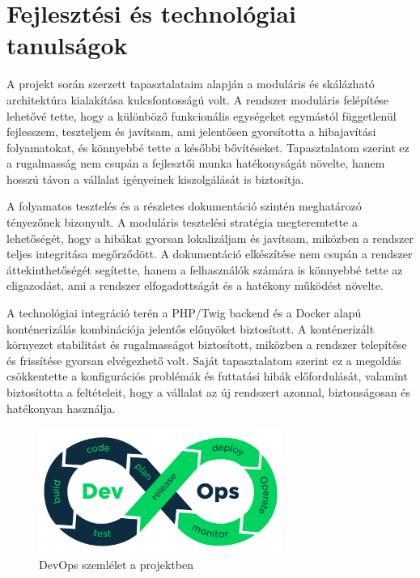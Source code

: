 \section{Fejlesztési és technológiai tanulságok}

A projekt során szerzett tapasztalataim alapján a moduláris és skálázható architektúra kialakítása kulcsfontosságú volt. 
A rendszer moduláris felépítése lehetővé tette, hogy a különböző funkcionális egységeket egymástól függetlenül fejlesszem, 
teszteljem és javítsam, ami jelentősen gyorsította a hibajavítási folyamatokat, és könnyebbé tette a későbbi bővítéseket. 
Tapasztalatom szerint ez a rugalmasság nem csupán a fejlesztői munka hatékonyságát növelte, hanem hosszú távon a vállalat igényeinek kiszolgálását is biztosítja.

A folyamatos tesztelés és a részletes dokumentáció szintén meghatározó tényezőnek bizonyult. 
A moduláris tesztelési stratégia megteremtette a lehetőségét, hogy a hibákat gyorsan lokalizáljam és javítsam, 
miközben a rendszer teljes integritása megőrződött. A dokumentáció elkészítése nem csupán a rendszer 
áttekinthetőségét segítette, hanem a felhasználók számára is könnyebbé tette az eligazodást, ami a rendszer elfogadottságát és a hatékony működést növelte.

A technológiai integráció terén a PHP/Twig backend és a Docker alapú konténerizálás kombinációja 
jelentős előnyöket biztosított. A konténerizált környezet stabilitást és rugalmasságot biztosított, 
miközben a rendszer telepítése és frissítése gyorsan elvégezhető volt. Saját tapasztalatom szerint 
ez a megoldás csökkentette a konfigurációs problémák és futtatási hibák előfordulását, 
valamint biztosította a feltételeit, hogy a vállalat az új rendszert azonnal, biztonságosan és hatékonyan használja.

\begin{figure}[H]
    \centering
    \includegraphics[width=80mm, keepaspectratio]{figures/devops.png}
    \caption{DevOps szemlélet a projektben}
    \label{fig:devops}
\end{figure}
